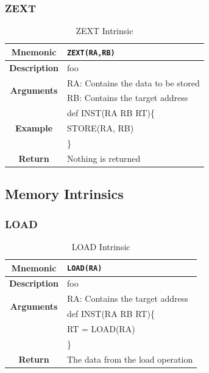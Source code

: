 \documentclass{article}
\begin{document}
\clearpage
\subsubsection{ZEXT}
\label{sec:ZEXT}

\begin{table}[h]
\begin{center}
\caption{ZEXT Intrinsic}
\vspace{0.125in}
\label{tab:ZEXTIntrinsic}
\begin{tabular}{|c|l|}
\hline
\textbf{Mnemonic} & \texttt{ZEXT(RA,RB)}\\
\hline
\textbf{Description} & foo\\
\hline
\multirow{2}{*}{\textbf{Arguments}} & RA: Contains the data to be stored\\
                          			     & RB: Contains the target address \\
\hline
\multirow{3}{*}{\textbf{Example}} & def INST(RA RB RT)\{\\
                          			  &   STORE(RA, RB)\\
                                                    & \}\\
\hline
\textbf{Return} & Nothing is returned\\                                                    
\hline
\end{tabular}
\end{center}
\end{table}

\clearpage
\subsection{Memory Intrinsics}
\label{sec:MemIntrinsics}

\subsubsection{LOAD}
\label{sec:LOAD}

\begin{table}[h]
\begin{center}
\caption{LOAD Intrinsic}
\vspace{0.125in}
\label{tab:LOADIntrinsic}
\begin{tabular}{|c|l|}
\hline
\textbf{Mnemonic} & \texttt{LOAD(RA)}\\
\hline
\textbf{Description} & foo\\
\hline
\multirow{2}{*}{\textbf{Arguments}} & RA: Contains the target address \\
\hline
\multirow{3}{*}{\textbf{Example}} & def INST(RA RB RT)\{\\
                          			  &   RT = LOAD(RA)\\
                                                    & \}\\
\hline
\textbf{Return} & The data from the load operation\\                                                    
\hline
\end{tabular}
\end{center}
\end{table}
\end{document}
